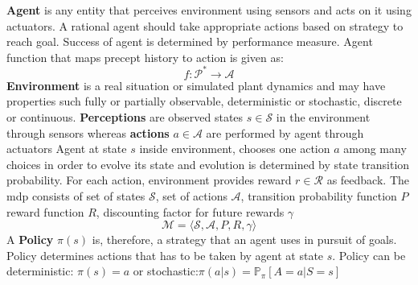 \noindent\textbf{Agent} is any entity that perceives environment using sensors and acts on it using actuators. A rational agent should take appropriate actions based on strategy to reach goal. Success of agent is determined by performance measure.
Agent function that maps precept history to action is given as:
\begin{equation}
    f: \mathcal{P}^*\longrightarrow \mathcal{A}
\end{equation}
\textbf{Environment} is a real situation or simulated plant dynamics and may have properties such fully or partially observable, deterministic or stochastic, discrete or continuous.
\textbf{Perceptions} are observed states $s\in \mathcal{S}$ in the environment through sensors whereas \textbf{actions} $a\in \mathcal{A}$ are performed by agent through actuators
Agent at state $s$ inside environment, chooses one action $a$ among many choices in order to evolve its state and evolution is determined by state transition probability. For each action, environment provides reward $r \in \mathcal{R}$ as feedback. The \acrfull{mdp} consists of set of states $\mathcal{S}$, set of actions $\mathcal{A}$, transition probability function $P$ reward function $R$, discounting factor for future rewards $\gamma$
\begin{equation*}
    \mathcal{M} = \langle \mathcal{S}, \mathcal{A}, P, R, \gamma \rangle
\end{equation*}
\noindent A \textbf{Policy} $\pi(s)$  is, therefore, a strategy that an agent uses in pursuit of goals.\cite{russell2010artificial} Policy determines actions that has to be taken by agent at state $s$. Policy can be deterministic: $\pi(s)=a$ or stochastic:$\pi(a \vert s) = \mathbb{P}_\pi [A=a \vert S=s]$

